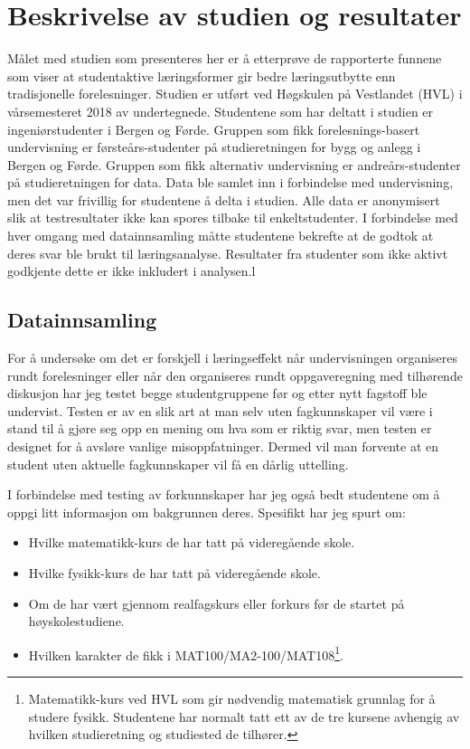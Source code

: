 \documentclass[a4paper,norsk,12pt]{article}
\begin{document}
\section{Beskrivelse av studien og resultater}
Målet med studien som presenteres her er å etterprøve de rapporterte funnene som viser at studentaktive læringsformer gir bedre læringsutbytte enn tradisjonelle forelesninger. Studien er utført ved Høgskulen på Vestlandet (HVL) i vårsemesteret 2018 av undertegnede. Studentene som har deltatt i studien er ingeniørstudenter i Bergen og Førde. Gruppen som fikk forelesnings-basert undervisning er førsteårs-studenter på studieretningen for bygg og anlegg i Bergen og Førde. Gruppen som fikk alternativ undervisning er andreårs-studenter på studieretningen for data. Data ble samlet inn i forbindelse med undervisning, men det var frivillig for studentene å delta i studien. Alle data er anonymisert slik at testresultater ikke kan spores tilbake til enkeltstudenter. I forbindelse med hver omgang med datainnsamling måtte studentene bekrefte at de godtok at deres svar ble brukt til læringsanalyse. Resultater fra studenter som ikke aktivt godkjente dette er ikke inkludert i analysen.l 

\subsection{Datainnsamling}
For å undersøke om det er forskjell i læringseffekt når undervisningen organiseres rundt forelesninger eller når den organiseres rundt oppgaveregning med tilhørende diskusjon har jeg testet begge studentgruppene før og etter nytt fagstoff ble undervist. Testen er av en slik art at man selv uten fagkunnskaper vil være i stand til å gjøre seg opp en mening om hva som er riktig svar, men testen er designet for å avsløre vanlige misoppfatninger. Dermed vil man forvente at en student uten aktuelle fagkunnskaper vil få en dårlig uttelling.

I forbindelse med testing av forkunnskaper har jeg også bedt studentene om å oppgi litt informasjon om bakgrunnen deres. Spesifikt har jeg spurt om:
\begin{itemize}
\item
	Hvilke matematikk-kurs de har tatt på videregående skole.
\item
	Hvilke fysikk-kurs de har tatt på videregående skole.
\item
	Om de har vært gjennom realfagskurs eller forkurs før de startet på høyskolestudiene.
\item
	Hvilken karakter de fikk i MAT100/MA2-100/MAT108\footnote{Matematikk-kurs ved HVL som gir nødvendig matematisk grunnlag for å studere fysikk. Studentene har normalt tatt ett av de tre kursene avhengig av hvilken studieretning og studiested de tilhører.}.
\end{itemize}
\end{document}
